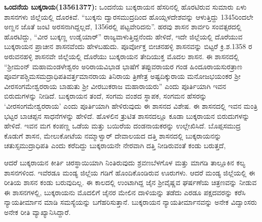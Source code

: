 \textbf{ ಒಂದನೆಯ ಬುಕ್ಕರಾಯ(13561377):} ಒಂದನೆಯ ಬುಕ್ಕರಾಯನ ಹೆಸರಿನಲ್ಲಿ ಹೊರಟಿರುವ ಸುಮಾರು ಏಳು ಶಾಸನಗಳು ಜಿಲ್ಲೆಯಲ್ಲಿ ದೊರಕಿವೆ. “ಬುಕ್ಕನು ದ್ವಾರಸಮುದ್ರದಿಂದ ಹೊಯ್ಸಳದೇಶವನ್ನು ಆಳುತ್ತಿದ್ದು 1345ರಿಂದಲೇ ಅಣ್ಣನ ಜೊತೆ ಜಂಟಿ ಅರಸನಾಗಿದ್ದಲ್ಲದೆ, 1356ರಲ್ಲಿ ಪಟ್ಟವೇರಿದನು”. ಹರವು ಶಾಸನ ಶಾರ್ವರಿ ಸಂವತ್ಸರದಲ್ಲಿ ಹೊರಟಿದ್ದು, “ವೀರ ಬುಕ್ಕಣ್ಣ ಉಡೈಯಾರ್​” ರಾಜ್ಯವಾಳುತ್ತಿದ್ದನೆಂದು ಹೇಳಿದೆ, ಇದೇ ಜಿಲ್ಲೆಯಲ್ಲಿ ದೊರೆಯುವ ಬುಕ್ಕರಾಯನ ಪ್ರಾಚೀನ ಶಾಸನವೆಂದು ಹೇಳಬಹುದು. ಪೂರ್ವೋಕ್ತ ಬೀಚನಹಳ್ಳಿ ಶಾಸನವನ್ನು ಬಿಟ್ಟರೆ ಕ್ರಿ.ಶ.1358 ರ ಅರುವನಹಳ್ಳಿ ಶಾಸನವೇ ಜಿಲ್ಲೆಯಲ್ಲಿ ದೊರೆಯು ಬುಕ್ಕರಾಯನ ತೇದಿಯುಕ್ತ ಮೊದಲ ಶಾಸನ. ಈ ಶಾಸನದಲ್ಲಿ “ಶ‍್ರೀಮಂನ್​ ಮಹಾಮಂಡಳೇಶ್ವರಂ ಅರಿರಾಯವಿಭಾಡ ಭಾಷೆಗೆ ತಪ್ಪುವರಾಯರ ಗಂಡ ಹಿಂದೂರಾಯಸುರತ್ರಾಣ ಪೂರ್ವಪಶ್ಚಿಮಸಮದ್ರಾಧಿಪತಿ\break ವರ್ತ್ತಮಾನರಾಯ ತಿನಿರಾಯ ತ್ರಿಣೇತ್ರ ಅಷ್ಟದಿಕ್ಕುರಾಯ ಮನೋಜಭಯಂಕರ ಶ‍್ರೀ ವೀರಸಂಗಮೇಶ್ವರರಾಯ ಬಾಹುತು ಶ‍್ರೀ ವೀರಬುಕರಾಜ ಮಹಾರಾಯರು” ಎಂದು ಪೂರ್ತಿಯಾಗಿ ಇವನ ಬಿರುದುಗಳನ್ನು ನೀಡಿದೆ. ಬುಕ್ಕರಾಯನ ತಂದೆ, ಸಂಗಮ ವಂಶದ ಸ್ಥಾಪಕ, ಸಂಗಮನ ಹೆಸರನ್ನು ‘ವೀರಸಂಗಮೇಶ್ವರರಾಯ’ ಎಂದು ಪೂರ್ತಿಯಾಗಿ ಹೇಳಿರುವುದು ಈ ಶಾಸನದ ವಿಶೇಷ. ಈ ಶಾಸನದಲ್ಲಿ ಇವನ ಮಂತ್ರಿ ಭಟ್ಟರ ಬಾಚಪ್ಪನ ಸಾಧನೆಗಳನ್ನು ಹೇಳಿದೆ. ಹೊಳಲಿನ ತ್ರುಟಿತ ಶಾಸನದಲ್ಲೂ ಕೂಡಾ ಬುಕ್ಕರಾಯನ ಬಿರುದುಗಳನ್ನು ಹೇಳಿದೆ. ಇವನ ಮಗ ಕಂಪಣ್ಣ ಒಡೆಯ ಮತ್ತು ಬಯಿರೆಯ ದಂಡನಾಯಕರನ್ನು ಉಲ್ಲೇಖಿಸಿದೆ. ಬೊಪ್ಪಸಮುದ್ರ ಕೊಡುಗೆ ಶಾಸನ, ಮೇಲುಕೋಟೆಯ ನಮ್ಮಾಳ್ವಾರ್​ ದೇವಾಲಯದ ದತ್ತಿ ಶಾಸನದಲ್ಲಿ ಬುಕ್ಕರಾಯನನ್ನು ಚತುಸ್ಸಮುದ್ರಾಧಿಪತಿ ಎಂದು ಕರೆದಿದ್ದು ಬುಕ್ಕರಾಯನೇ ನೇರವಾಗಿ ದತ್ತಿ ನೀಡಿರುವಂತೆ ಕಂಡು ಬರುತ್ತದೆ, 

\vskip 3pt

ಆದರೆ ಬುಕ್ಕರಾಯನ ಕೀರ್ತಿ ಚಿರಸ್ಥಾಯಿಯಾಗಿ ನಿಂತಿರುವುದು ಶ್ರವಣಬೆಳಗೊಳ ಮತ್ತು ಮಾಗಡಿ ತಾಲ್ಲೂಕಿನ ಕಲ್ಯ ಶಾಸನಗಳಿಂದ. ಇವೆರಡೂ ಮಂಡ್ಯ ಜಿಲ್ಲೆಯ ಗಡಿಗೆ ಹೊಂದಿಕೊಂಡಿರುವ ಊರುಗಳು. ಆದರೆ ಮಂಡ್ಯ ಜಿಲ್ಲೆಯಲ್ಲಿ ಈ ರೀತಿಯ ಶಾಸನ ಕಂಡು ಬರುವುದಿಲ್ಲ. ಈ ಕಾಲದಲ್ಲಿ ಉಂಟಾಗಿದ್ದ ಜೈನ ಶ‍್ರೀವೈಷ್ಣವ ಘರ್ಷಣೆಯ ಚಿತ್ರಣವನ್ನು ನೀಡುವ ಈ ಶಾಸನಗಳಲ್ಲಿ, ಬುಕ್ಕರಾಯನು ಮೊದಲಿಗೆ ಜೈನರ ಮೇಲಿನ ದಾಳಿಯನ್ನು ತಡೆದು ಎರಡೂ ಪಕ್ಷದವರನ್ನು ಕರೆಸಿ ನ್ಯಾಯತೀರ್ಮಾನ ಮಾಡಿ ಸಮಸ್ಯೆಯನ್ನು ಬಗೆಹರಿಸುತ್ತಾನೆ. ಬುಕ್ಕರಾಯನ ನ್ಯಾಯತೀರ್ಮಾನವನ್ನು ಅನೇಕ ವಿದ್ವಾಂಸರು ಅನೇಕ ರೀತಿ ವ್ಯಾಖ್ಯಾನಿಸಿದ್ದಾರೆ. 

